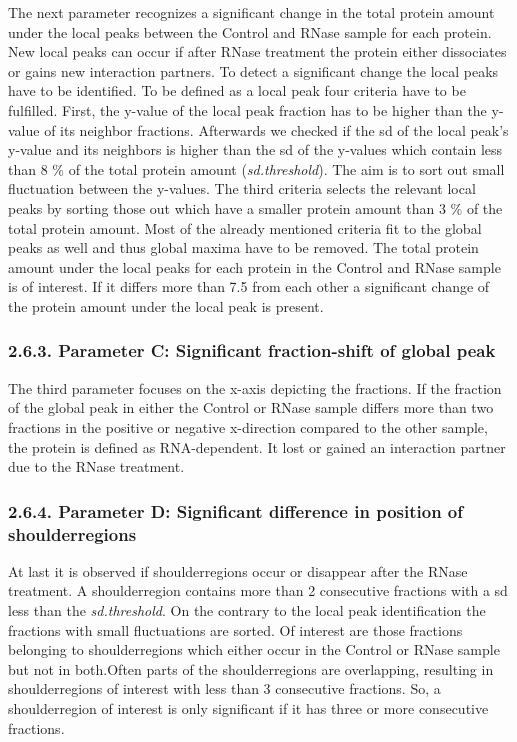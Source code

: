 \documentclass[
  12pt,
]{article}
\begin{document}
The next parameter recognizes a significant change in the total protein
amount under the local peaks between the Control and RNase sample for
each protein. New local peaks can occur if after RNase treatment the
protein either dissociates or gains new interaction partners. To detect
a significant change the local peaks have to be identified. To be
defined as a local peak four criteria have to be fulfilled. First, the
y-value of the local peak fraction has to be higher than the y-value of
its neighbor fractions. Afterwards we checked if the sd of the local
peak's y-value and its neighbors is higher than the sd of the y-values
which contain less than 8 \% of the total protein amount
(\emph{sd.threshold}). The aim is to sort out small fluctuation between
the y-values. The third criteria selects the relevant local peaks by
sorting those out which have a smaller protein amount than 3 \% of the
total protein amount. Most of the already mentioned criteria fit to the
global peaks as well and thus global maxima have to be removed. The
total protein amount under the local peaks for each protein in the
Control and RNase sample is of interest. If it differs more than 7.5
from each other a significant change of the protein amount under the
local peak is present.

\hypertarget{parameter-c-significant-fraction-shift-of-global-peak}{%
\subsubsection{2.6.3. Parameter C: Significant fraction-shift of global
peak}\label{parameter-c-significant-fraction-shift-of-global-peak}}

The third parameter focuses on the x-axis depicting the fractions. If
the fraction of the global peak in either the Control or RNase sample
differs more than two fractions in the positive or negative x-direction
compared to the other sample, the protein is defined as RNA-dependent.
It lost or gained an interaction partner due to the RNase treatment.

\hypertarget{parameter-d-significant-difference-in-position-of-shoulderregions}{%
\subsubsection{2.6.4. Parameter D: Significant difference in position of
shoulderregions}\label{parameter-d-significant-difference-in-position-of-shoulderregions}}

At last it is observed if shoulderregions occur or disappear after the
RNase treatment. A shoulderregion contains more than 2 consecutive
fractions with a sd less than the \emph{sd.threshold}. On the contrary
to the local peak identification the fractions with small fluctuations
are sorted. Of interest are those fractions belonging to shoulderregions
which either occur in the Control or RNase sample but not in both.Often
parts of the shoulderregions are overlapping, resulting in
shoulderregions of interest with less than 3 consecutive fractions. So,
a shoulderregion of interest is only significant if it has three or more
consecutive fractions.
\end{document}
